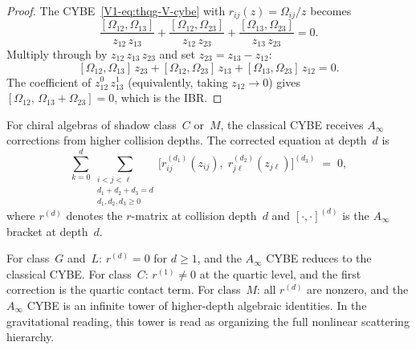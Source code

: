 \begin{proof}
The CYBE~\eqref{V1-eq:thqg-V-cybe} with
$r_{ij}(z) = \Omega_{ij}/z$ becomes
\[
\frac{[\Omega_{12},\Omega_{13}]}{z_{12}\,z_{13}}
+
\frac{[\Omega_{12},\Omega_{23}]}{z_{12}\,z_{23}}
+
\frac{[\Omega_{13},\Omega_{23}]}{z_{13}\,z_{23}}
= 0.
\]
Multiply through by $z_{12}\,z_{13}\,z_{23}$ and set
$z_{23} = z_{13} - z_{12}$:
\[
[\Omega_{12},\Omega_{13}]\,z_{23}
+ [\Omega_{12},\Omega_{23}]\,z_{13}
+ [\Omega_{13},\Omega_{23}]\,z_{12}
= 0.
\]
The coefficient of $z_{12}^0\,z_{13}^1$ (equivalently,
taking $z_{12} \to 0$) gives
$[\Omega_{12},\,\Omega_{13} + \Omega_{23}] = 0$,
which is the IBR\@.
\end{proof}

\begin{proposition}
For chiral algebras of shadow class~$C$ or~$M$, the classical
CYBE receives $A_\infty$ corrections from higher collision depths.
The corrected equation at depth~$d$ is
\begin{equation}%
\sum_{k=0}^{d}
\sum_{\substack{i<j<\ell \\
 d_1 + d_2 + d_3 = d \\
 d_1, d_2, d_3 \geq 0}}
\bigl[
 r^{(d_1)}_{ij}(z_{ij}),\;
 r^{(d_2)}_{j\ell}(z_{j\ell})
\bigr]^{(d_3)}
\;=\; 0,
\end{equation}
where $r^{(d)}$ denotes the $r$-matrix at collision depth~$d$ and
$[\cdot,\cdot]^{(d)}$ is the $A_\infty$ bracket at depth~$d$.

For class~$G$ and~$L$: $r^{(d)} = 0$ for $d \geq 1$, and the
$A_\infty$ CYBE reduces to the classical CYBE\@.
For class~$C$: $r^{(1)} \neq 0$ at the quartic level, and the
first correction is the quartic contact term.
For class~$M$: all $r^{(d)}$ are nonzero, and the $A_\infty$ CYBE
is an infinite tower of higher-depth algebraic identities. In the
gravitational reading, this tower is read as organizing the full
nonlinear scattering hierarchy.
\end{proposition}

